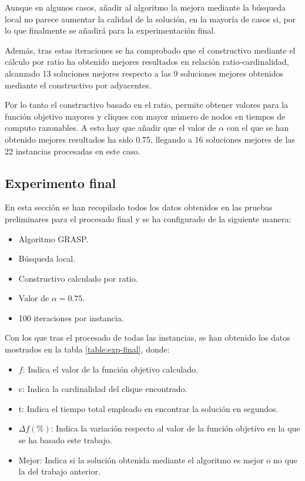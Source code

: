 Aunque en algunos casos, añadir al algoritmo la mejora mediante la búsqueda local no parece aumentar la calidad de la solución, en la mayoría de casos si, por lo que finalmente se añadirá para la experimentación final. 

Además, tras estas iteraciones se ha comprobado que el constructivo mediante el cálculo por ratio ha obtenido mejores resultados en relación ratio-cardinalidad, alcanzado 13 soluciones mejores respecto a las 9 soluciones mejores obtenidos mediante el constructivo por adyacentes. 

Por lo tanto el constructivo basado en el ratio, permite obtener valores para la función objetivo mayores y cliques con mayor número de nodos en tiempos de computo razonables. A esto hay que añadir que el valor de $\alpha$ con el que se han obtenido mejores resultados ha sido 0.75, llegando a 16 soluciones mejores de las 22 instancias procesadas en este caso.


\subsection{Experimento final}

En esta sección se han recopilado todos los datos obtenidos en las pruebas preliminares para el procesado final y se ha configurado de la siguiente manera:
\begin{itemize}
	\item Algoritmo \gls{GRASP}.
	\item Búsqueda local.
	\item Constructivo calculado por ratio.
	\item Valor de $\alpha = 0.75$. 
	\item 100 iteraciones por instancia.
\end{itemize}

Con los que tras el procesado de todas las instancias, se han obtenido los datos mostrados en la tabla \ref{table:exp-final}, donde:
\begin{itemize}
	\item $f$: Indica el valor de la función objetivo calculado.
	\item c: Indica la cardinalidad del clique encontrado.
	\item t: Indica el tiempo total empleado en encontrar la solución en segundos.
	\item $\Delta f (\%)$: Indica la variación respecto al valor de la función objetivo en la que se ha basado este trabajo.
	\item Mejor: Indica si la solución obtenida mediante el algoritmo es mejor o no que la del trabajo anterior.
\end{itemize}

